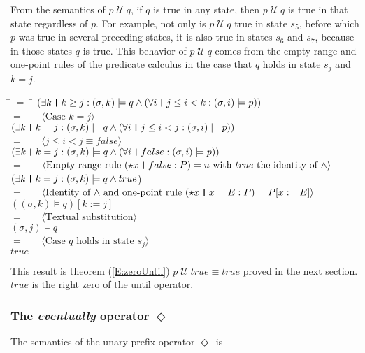 \documentclass[fleqn, leqno]{article}
\newcommand{\lgap}{2pt} %
\newcommand{\mymathindent}{24pt} %
\newcommand{\Until}{\;\mathcal{U}\;}
\newcommand{\Event}{\Diamond\,}
\newcommand{\thedr}{\rule[-.25ex]{.32mm}{1.75ex}} %
\newcommand{\dr}{\;\,\thedr\,\;} %
\newcommand{\rb}{:} %
\newcommand{\all}{\forall} %
\newcommand{\ext}{\exists} %
\newcommand{\Gll} {\langle} %
\newcommand{\Ggg} {\rangle} %
\newcommand{\Hint}[1] {\ \ \ $\Gll \mbox{#1} \Ggg$ } %
\begin{document}
From the semantics of $p\Until q$, if $q$ is true in any state, then $p\Until q$ is true in that state regardless of $p$.
For example, not only is $p\Until q$ true in state $s_5$, before which $p$ was true in several preceding states,
it is also true in states $s_6$ and $s_7$, because in those states $q$ is true.
This behavior of $p\Until q$ comes from the empty range and one-point rules \cite{LADM} of the predicate calculus in the case that
$q$ holds in state $s_j$ and $k=j$.

\begin{tabbing}
\hspace{\mymathindent} \= $= \;$ \= \kill
\> \> $(\ext k \dr k \ge j \rb (\sigma,k) \models q \land (\all i \dr j\le i < k \rb (\sigma,i) \models p))$\\[\lgap]
\> $=$ \> \Hint{Case $k=j$}\\[\lgap]
\> \> $(\ext k \dr k=j \rb (\sigma,k) \models q \land (\all i \dr j\le i < j \rb (\sigma,i) \models p))$\\[\lgap]
\> $=$ \> \Hint{$j\le i < j \equiv false$}\\[\lgap]
\> \> $(\ext k \dr k=j \rb (\sigma,k) \models q \land (\all i \dr false \rb (\sigma,i) \models p))$\\[\lgap]
\> $=$ \> \Hint{Empty range rule $(\star x \dr false \rb P) =u$ with $true$ the identity of $\land$}\\[\lgap]
\> \> $(\ext k \dr k=j \rb (\sigma,k) \models q \land true$)\\[\lgap]
\> $=$ \> \Hint{Identity of $\land$ and one-point rule $(\star x\dr x=E\rb P) = P[x:=E]$}\\[\lgap]
\> \> $((\sigma,k) \models q)[k := j]$\\[\lgap]
\> $=$ \> \Hint{Textual substitution}\\[\lgap]
\> \> $(\sigma,j) \models q$\\[\lgap]
\> $=$ \> \Hint{Case $q$ holds in state $s_j$}\\[\lgap]
\> \> $true$
\end{tabbing}


This result is theorem (\ref{E:zeroUntil}) $p \Until true \equiv true$ proved in the next section.
$true$ is the right zero of the until operator.

\subsubsection*{The \textit{eventually} operator $\Event$}

The semantics of the unary prefix operator $\Event$ is
\end{document}
